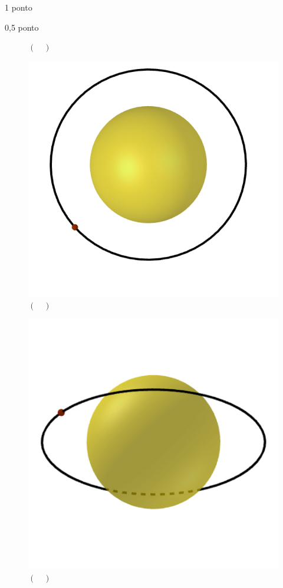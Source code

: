 \documentclass{../lista}
\begin{document}
\begin{questao}{1 ponto}
\begin{pergunta}{0,5 ponto}
\begin{multicols}{3}
\begin{figure}[H]
					\captionsetup{labelformat=empty}
					\caption{$(\quad)$}
				\end{figure}
				\begin{figure}[H]
					\centering
					\includegraphics[scale=0.2]{./img/5b5.png}
					\captionsetup{labelformat=empty}
					\caption{$(\quad)$}
				\end{figure}
				\begin{figure}[H]
					\centering
					\includegraphics[scale=0.2]{./img/5b6.png}
					\captionsetup{labelformat=empty}
					\caption{$(\quad)$}
				\end{figure}
			\end{multicols}
		\end{pergunta}


\end{questao}
\end{document}
